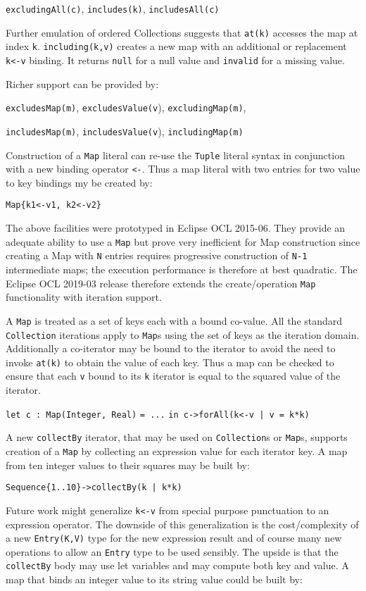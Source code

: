 \documentclass{llncs}
\begin{document}
\verb$excludingAll(c)$, \verb$includes(k)$, \verb$includesAll(c)$

Further emulation of ordered Collections suggests that \verb$at(k)$ accesses the map at index \verb$k$. \verb$including(k,v)$ creates a new map with an additional or replacement \verb$k<-v$ binding. It returns \verb$null$ for a null value and \verb$invalid$ for a missing value.

Richer support can be provided by:

\verb$excludesMap(m)$, \verb$excludesValue(v$), \verb$excludingMap(m)$,

\verb$includesMap(m)$, \verb$includesValue(v$), \verb$includingMap(m)$

Construction of a \verb$Map$ literal can re-use the \verb$Tuple$ literal syntax in conjunction with a new binding operator \verb$<-$. Thus a map literal with two entries for two value to key bindings my be created by:

\verb$Map{k1<-v1, k2<-v2}$

The above facilities were prototyped in Eclipse OCL 2015-06. They provide an adequate ability to use a \verb$Map$ but prove very inefficient for Map construction since creating a Map with \verb$N$ entries requires progressive construction of \verb$N-1$ intermediate maps; the execution performance is therefore at best quadratic. The Eclipse OCL 2019-03 release therefore extends the create/operation \verb$Map$ functionality with iteration support.

A \verb$Map$ is treated as a set of keys each with a bound co-value. All the standard \verb$Collection$ iterations apply to \verb$Map$s using the set of keys as the iteration domain. Additionally a co-iterator may be bound to the iterator to avoid the need to invoke \verb$at(k)$ to obtain the value of each key. Thus a map can be checked to ensure that each \verb$v$ bound to its \verb$k$ iterator is equal to the squared value of the iterator.

\verb$let c : Map(Integer, Real)$ \verb$= ...$ \verb$in c->forAll(k<-v | v = k*k)$

A new \verb$collectBy$ iterator, that may be used on \verb$Collection$s or \verb$Map$s, supports creation of a \verb$Map$ by collecting an expression value for each iterator key. A map from ten integer values to their squares may be built by:

\verb$Sequence{1..10}->collectBy(k | k*k)$

Future work might generalize \verb$k<-v$ from special purpose punctuation to an expression operator. The downside of this generalization is the cost/complexity of a new \verb$Entry(K,V)$ type for the new expression result and of course many new operations to allow an \verb$Entry$ type to be used sensibly. The upside is that the \verb$collectBy$ body may use let variables and may compute both key and value. A map that binds an integer value  to its string value could be built by: 
\end{document}
